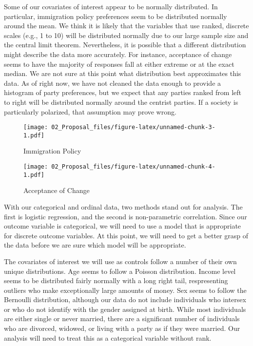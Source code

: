 \documentclass[11pt,]{article}
\begin{document}
Some of our covariates of interest appear to be normally distributed. In
particular, immigration policy preferences seem to be distributed
normally around the mean. We think it is likely that the variables that
use ranked, discrete scales (e.g., 1 to 10) will be distributed normally
due to our large sample size and the central limit theorem.
Nevertheless, it is possible that a different distribution might
describe the data more accurately. For instance, acceptance of change
seems to have the majority of responses fall at either extreme or at the
exact median. We are not sure at this point what distribution best
approximates this data. As of right now, we have not cleaned the data
enough to provide a histogram of party preferences, but we expect that
any parties ranked from left to right will be distributed normally
around the centrist parties. If a society is particularly polarized,
that assumption may prove wrong.

\begin{figure}[htbp]
\centering
\texttt{[image: 02\_Proposal\_files/figure-latex/unnamed-chunk-3-1.pdf]}
\caption{Immigration Policy}
\end{figure}

\begin{figure}[htbp]
\centering
\texttt{[image: 02\_Proposal\_files/figure-latex/unnamed-chunk-4-1.pdf]}
\caption{Acceptance of Change}
\end{figure}

With our categorical and ordinal data, two methods stand out for
analysis. The first is logistic regression, and the second is
non-parametric correlation. Since our outcome variable is categorical,
we will need to use a model that is appropriate for discrete outcome
variables. At this point, we will need to get a better grasp of the data
before we are sure which model will be appropriate.

\pagebreak

The covariates of interest we will use as controls follow a number of
their own unique distributions. Age seems to follow a Poisson
distribution. Income level seems to be distributed fairly normally with
a long right tail, respresenting outliers who make exceptionally large
amounts of money. Sex seems to follow the Bernoulli distribution,
although our data do not include individuals who intersex or who do not
identify with the gender assigned at birth. While most individuals are
either single or never married, there are a significant number of
individuals who are divorced, widowed, or living with a party as if they
were married. Our analysis will need to treat this as a categorical
variable without rank.
\end{document}
